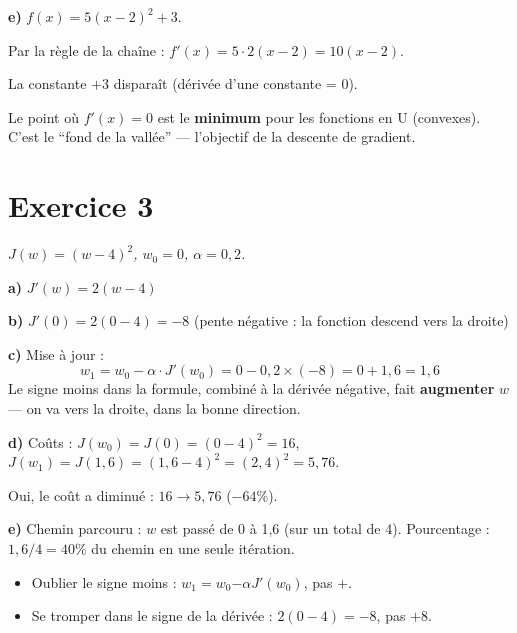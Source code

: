 \medskip
\textbf{e)} $f(x) = 5(x-2)^2 + 3$.

Par la r\`{e}gle de la cha\^{i}ne : $f'(x) = 5 \cdot 2(x-2) = \boxed{10(x-2)}$.

La constante $+3$ dispara\^{i}t (d\'{e}riv\'{e}e d'une constante = 0).

\begin{retenirbox}
    Le point o\`{u} $f'(x) = 0$ est le \textbf{minimum} pour les fonctions en U (convexes).
    C'est le ``fond de la vall\'{e}e'' --- l'objectif de la descente de gradient.
\end{retenirbox}

\section*{Exercice 3 \hfill \exofondamental}
\textit{$J(w) = (w - 4)^2$, $w_0 = 0$, $\alpha = 0{,}2$.}

\separateur

\textbf{a)} $J'(w) = \boxed{2(w - 4)}$

\textbf{b)} $J'(0) = 2(0 - 4) = \boxed{-8}$
\quad (pente n\'{e}gative : la fonction descend vers la droite)

\textbf{c)} Mise \`{a} jour :
\[
    w_1 = w_0 - \alpha \cdot J'(w_0) = 0 - 0{,}2 \times (-8) = 0 + 1{,}6 = \boxed{1{,}6}
\]
Le signe moins dans la formule, combin\'{e} \`{a} la d\'{e}riv\'{e}e n\'{e}gative, fait \textbf{augmenter} $w$ --- on va vers la droite, dans la bonne direction.

\textbf{d)} Co\^{u}ts :
$J(w_0) = J(0) = (0-4)^2 = \boxed{16}$,\quad
$J(w_1) = J(1{,}6) = (1{,}6-4)^2 = (2{,}4)^2 = \boxed{5{,}76}$.

Oui, le co\^{u}t a diminu\'{e} : $16 \to 5{,}76$ ($-64\%$). \checkmark

\textbf{e)} Chemin parcouru : $w$ est pass\'{e} de 0 \`{a} 1{,}6 (sur un total de 4).
Pourcentage : $1{,}6 / 4 = \boxed{40\%}$ du chemin en une seule it\'{e}ration.

\begin{attentionbox}
    \begin{itemize}
        \item Oublier le signe moins : $w_1 = w_0 \mathbf{-} \alpha J'(w_0)$, pas $+$.
        \item Se tromper dans le signe de la d\'{e}riv\'{e}e : $2(0-4) = -8$, pas $+8$.
    \end{itemize}
\end{attentionbox}

